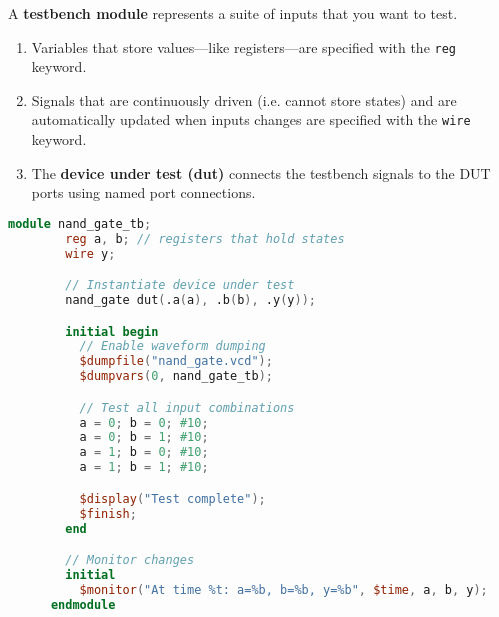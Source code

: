   \begin{definition}
    A \textbf{testbench module} represents a suite of inputs that you want to test. 
    \begin{enumerate}
      \item Variables that store values---like registers---are specified with the \texttt{reg} keyword. 
      \item Signals that are continuously driven (i.e. cannot store states) and are automatically updated when inputs changes are specified with the \texttt{wire} keyword. 
      \item The \textbf{device under test (dut)} connects the testbench signals to the DUT ports using named port connections. 
    \end{enumerate}

    \begin{lstlisting}[language=Verilog]
      module nand_gate_tb;
        reg a, b; // registers that hold states
        wire y;

        // Instantiate device under test
        nand_gate dut(.a(a), .b(b), .y(y));

        initial begin
          // Enable waveform dumping
          $dumpfile("nand_gate.vcd");
          $dumpvars(0, nand_gate_tb);

          // Test all input combinations
          a = 0; b = 0; #10;
          a = 0; b = 1; #10;
          a = 1; b = 0; #10;
          a = 1; b = 1; #10;

          $display("Test complete");
          $finish;
        end

        // Monitor changes
        initial
          $monitor("At time %t: a=%b, b=%b, y=%b", $time, a, b, y);
      endmodule
    \end{lstlisting}
  \end{definition}

